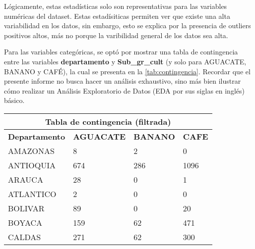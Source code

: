 \documentclass[12pt,a4paper]{article}
\begin{document}
Lógicamente, estas estadísticas solo son representativas para las variables numéricas del dataset. 
Estas estadísiticas permiten ver que existe una alta variabilidad en los datos, sin embargo, esto 
se explica por la presencia de outliers positivos altos, más no porque la varibilidad general 
de los datos sea alta.

Para las variables categóricas, se optó por mostrar una tabla de contingencia entre las variables 
\textbf{departamento} y \textbf{Sub\_gr\_cult} (y solo para AGUACATE, BANANO y CAFÉ), la cual se 
presenta en la \cref{tab:contingencia}. Recordar que el presente informe no busca hacer un análisis 
exhaustivo, sino más bien ilustrar cómo realizar un Análisis Exploratorio de Datos (EDA por sus siglas 
en inglés) básico.


\begin{table}[]
    \centering
    \begin{tabular}{|llll|}
        \hline
        \multicolumn{4}{|c|}{\textbf{Tabla de contingencia (filtrada)}}                                                                                \\ \hline
        \multicolumn{1}{|l|}{\textbf{Departamento}}    & \multicolumn{1}{l|}{\textbf{AGUACATE}} & \multicolumn{1}{l|}{\textbf{BANANO}} & \textbf{CAFE} \\ \hline
        \multicolumn{1}{|l|}{AMAZONAS}                 & \multicolumn{1}{l|}{8}                 & \multicolumn{1}{l|}{2}               & 0             \\ \hline
        \multicolumn{1}{|l|}{ANTIOQUIA}                & \multicolumn{1}{l|}{674}               & \multicolumn{1}{l|}{286}             & 1096          \\ \hline
        \multicolumn{1}{|l|}{ARAUCA}                   & \multicolumn{1}{l|}{28}                & \multicolumn{1}{l|}{0}               & 1             \\ \hline
        \multicolumn{1}{|l|}{ATLANTICO}                & \multicolumn{1}{l|}{2}                 & \multicolumn{1}{l|}{0}               & 0             \\ \hline
        \multicolumn{1}{|l|}{BOLIVAR}                  & \multicolumn{1}{l|}{89}                & \multicolumn{1}{l|}{0}               & 20            \\ \hline
        \multicolumn{1}{|l|}{BOYACA}                   & \multicolumn{1}{l|}{159}               & \multicolumn{1}{l|}{62}              & 471           \\ \hline
        \multicolumn{1}{|l|}{CALDAS}                   & \multicolumn{1}{l|}{271}               & \multicolumn{1}{l|}{62}              & 300           \\ \hline

\end{tabular}
\end{table}
\end{document}

